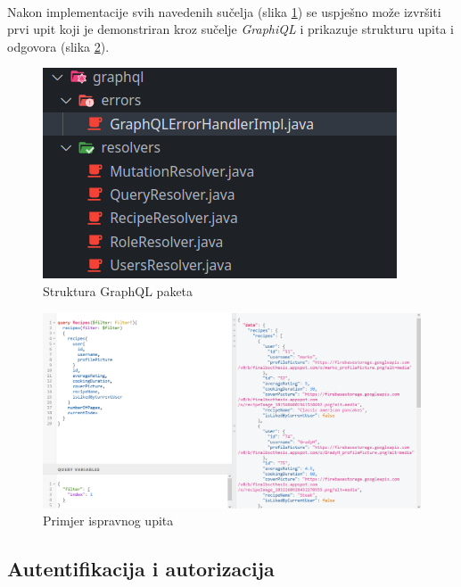 \documentclass[times, utf8, zavrsni]{fer}
\begin{document}
\\
Nakon implementacije svih navedenih sučelja (slika \ref{fig:GraphQL implementation}) se
uspješno može izvršiti prvi upit koji je demonstriran kroz sučelje \textit{GraphiQL} i
prikazuje strukturu upita i odgovora (slika \ref{fig:GraphQL query}).
\begin{figure}[h]
      \centering
      \includegraphics[width=.5\textwidth]{graphql_implementation_classes.png}
      \caption{Struktura GraphQL paketa}
      \label{fig:GraphQL implementation}
\end{figure}
\begin{figure}[h]
      \centering
      \includegraphics[width=\textwidth]{graphql_query.png}
      \caption{Primjer ispravnog upita}
      \label{fig:GraphQL query}
\end{figure}


\subsection{Autentifikacija i autorizacija}
\end{document}
